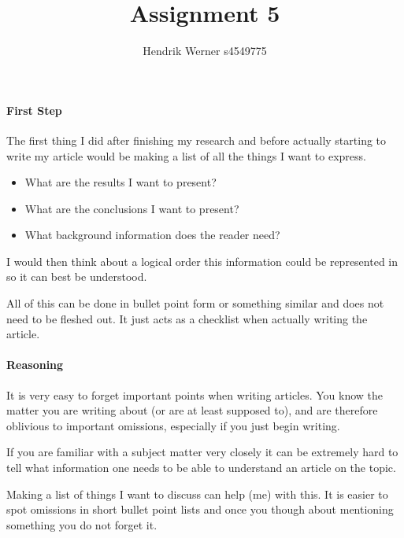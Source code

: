\documentclass[12pt, a4paper]{article}
\title{Assignment 5}
\author{Hendrik Werner s4549775}
\begin{document}
\maketitle

\paragraph{First Step}
The first thing I did after finishing my research and before actually starting to write my article would be making a list of all the things I want to express.

\begin{itemize}
	\item What are the results I want to present?
	\item What are the conclusions I want to present?
	\item What background information does the reader need?
\end{itemize}

I would then think about a logical order this information could be represented in so it can best be understood.

All of this can be done in bullet point form or something similar and does not need to be fleshed out. It just acts as a checklist when actually writing the article.

\paragraph{Reasoning}
It is very easy to forget important points when writing articles. You know the matter you are writing about (or are at least supposed to), and are therefore oblivious to important omissions, especially if you just begin writing.

If you are familiar with a subject matter very closely it can be extremely hard to tell what information one needs to be able to understand an article on the topic.

Making a list of things I want to discuss can help (me) with this. It is easier to spot omissions in short bullet point lists and once you though about mentioning something you do not forget it.
\end{document}
